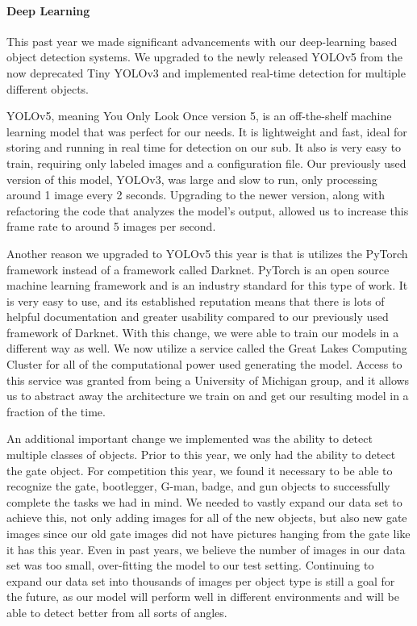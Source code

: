 \documentclass[conference]{IEEEtran}
\begin{document}
    
    \paragraph{Deep Learning}
    This past year we made significant advancements with our deep-learning based object detection systems. We upgraded to the newly released YOLOv5 from the now deprecated Tiny YOLOv3 and implemented real-time detection for multiple different objects. 
    
    YOLOv5, meaning You Only Look Once version 5, is an off-the-shelf machine learning model that was perfect for our needs. It is lightweight and fast, ideal for storing and running in real time for detection on our sub. It also is very easy to train, requiring only labeled images and a configuration file. Our previously used version of this model, YOLOv3, was large and slow to run, only processing around 1 image every 2 seconds. Upgrading to the newer version, along with refactoring the code that analyzes the model's output, allowed us to increase this frame rate to around 5 images per second.
    
    Another reason we upgraded to YOLOv5 this year is that is utilizes the PyTorch framework instead of a framework called Darknet. PyTorch is an open source machine learning framework and is an industry standard for this type of work. It is very easy to use, and its established reputation means that there is lots of helpful documentation and greater usability compared to our previously used framework of Darknet. With this change, we were able to train our models in a different way as well. We now utilize a service called the Great Lakes Computing Cluster for all of the computational power used generating the model. Access to this service was granted from being a University of Michigan group, and it allows us to abstract away the architecture we train on and get our resulting model in a fraction of the time.
    
    An additional important change we implemented was the ability to detect multiple classes of objects. Prior to this year, we only had the ability to detect the gate object. For competition this year, we found it necessary to be able to recognize the gate, bootlegger, G-man, badge, and gun objects to successfully complete the tasks we had in mind. We needed to vastly expand our data set to achieve this, not only adding images for all of the new objects, but also new gate images since our old gate images did not have pictures hanging from the gate like it has this year. Even in past years, we believe the number of images in our data set was too small, over-fitting the model to our test setting. Continuing to expand our data set into thousands of images per object type is still a goal for the future, as our model will perform well in different environments and will be able to detect better from all sorts of angles.
    
\end{document}
